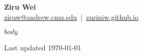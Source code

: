 \documentclass[a4paper,9pt]{extarticle}
\begin{document}
\pagestyle{empty}

\begin{center}
    {\Huge\bfseries Ziru Wei}\\[4pt]
    {\normalsize
      \href{mailto:ziruw@andrew.cmu.edu}{ziruw@andrew.cmu.edu} \,|\, 
      \href{https://zuriniw.github.io}{zuriniw.github.io}
    }\\
    \end{center}
    \vspace{0.5em}
    

$body$

\vfill
\begin{center}
\small{Last updated \today}
\end{center}
\end{document}

